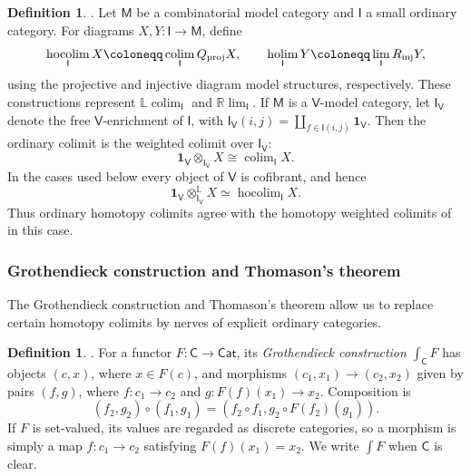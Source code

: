 \documentclass{amsart}
\newcommand{\cat}[1]{\mathsf{#1}}
\DeclareMathOperator*{\colim}{colim}
\DeclareMathOperator*{\holim}{holim}
\DeclareMathOperator*{\hocolim}{hocolim}
\newcommand{\proj}{\textnormal{proj}}
\newcommand{\inj}{\textnormal{inj}}
\newcommand{\unit}{\mathbf{1}}
\theoremstyle{definition}
\newtheorem{definition}[equation]{Definition}
\numberwithin{equation}{subsection}
\numberwithin{subsubsection}{subsection}
\begin{document}
\begin{definition}\label{def:homotopy.limits.colimits}
  \textnormal{\cite[Definition~8.2]{Shu06}}.
  Let \(\cat{M}\) be a combinatorial model category and
  \(\cat{I}\) a small ordinary category. For diagrams
  \(X,Y:\cat{I}\to\cat{M}\), define
  \[
    \hocolim_{\cat{I}}X
    \coloneqq
    \colim_{\cat{I}}Q_{\proj}X,
    \qquad
    \holim_{\cat{I}}Y
    \coloneqq
    \lim_{\cat{I}}R_{\inj}Y,
  \]
  using the projective and injective diagram model structures,
  respectively. These constructions represent
  \(\mathbb{L}\colim_{\cat{I}}\) and \(\mathbb{R}\lim_{\cat{I}}\).
  If \(\cat{M}\) is a \(\cat{V}\)-model category, let
  \(\cat{I}_{\cat{V}}\) denote the free \(\cat{V}\)-enrichment of
  \(\cat{I}\), with
  \(\cat{I}_{\cat{V}}(i,j)=
  \coprod_{f\in\cat{I}(i,j)}\unit_{\cat{V}}\). Then the ordinary colimit is
  the weighted colimit over \(\cat{I}_{\cat{V}}\):
  \[
    \unit_{\cat{V}}\otimes_{\cat{I}_{\cat{V}}}X
    \cong
    \colim_{\cat{I}}X.
  \]
  In the cases used below every object of \(\cat{V}\) is cofibrant, and
  hence
  \[
    \unit_{\cat{V}}
    \otimes^{\mathbb{L}}_{\cat{I}_{\cat{V}}}X
    \simeq
    \hocolim_{\cat{I}}X.
  \]
  Thus ordinary homotopy colimits agree with the homotopy weighted
  colimits of  in this case.
\end{definition}

\subsubsection{Grothendieck construction and Thomason's theorem}
The Grothendieck construction and Thomason's theorem allow us to replace certain
homotopy colimits by nerves of explicit ordinary categories.

\begin{definition}\label{def:grothendieck.construction}
  \textnormal{\cite[Definition~5.1.1]{Ric20}}.
  For a functor \(F:\cat{C}\to\cat{Cat}\), its \emph{Grothendieck
  construction} \(\int_{\cat{C}}F\) has objects \((c,x)\), where
  \(x\in F(c)\), and morphisms \((c_1,x_1)\to(c_2,x_2)\) given by pairs
  \((f,g)\), where \(f:c_1\to c_2\) and
  \(g:F(f)(x_1)\to x_2\). Composition is
  \[
    (f_2,g_2)\circ(f_1,g_1)
    =
    (f_2\circ f_1,g_2\circ F(f_2)(g_1)).
  \]
  If \(F\) is set-valued, its values are regarded as discrete categories,
  so a morphism is simply a map \(f:c_1\to c_2\) satisfying
  \(F(f)(x_1)=x_2\). We write \(\int F\) when \(\cat{C}\) is clear.
\end{definition}
\end{document}
